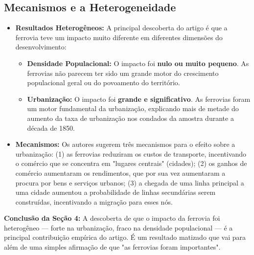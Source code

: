\documentclass[12pt, a4paper]{article}
\begin{document}
\subsection{Mecanismos e a Heterogeneidade}

\begin{itemize}
    \item \textbf{Resultados Heterogêneos:} A principal descoberta do artigo é que a ferrovia teve um impacto muito diferente em diferentes dimensões do desenvolvimento:
        \begin{itemize}
            \item \textbf{Densidade Populacional:} O impacto foi \textbf{nulo ou muito pequeno}. As ferrovias não parecem ter sido um grande motor do crescimento populacional geral ou do povoamento do território.
            \item \textbf{Urbanização:} O impacto foi \textbf{grande e significativo}. As ferrovias foram um motor fundamental da urbanização, explicando mais de metade do aumento da taxa de urbanização nos condados da amostra durante a década de 1850.
        \end{itemize}
    \item \textbf{Mecanismos:} Os autores sugerem três mecanismos para o efeito sobre a urbanização: (1) as ferrovias reduziram os custos de transporte, incentivando o comércio que se concentra em "lugares centrais" (cidades); (2) os ganhos de comércio aumentaram os rendimentos, que por sua vez aumentaram a procura por bens e serviços urbanos; (3) a chegada de uma linha principal a uma cidade aumentou a probabilidade de linhas secundárias serem construídas, incentivando a migração para esses nós.
\end{itemize}

\noindent\textbf{Conclusão da Seção 4:} A descoberta de que o impacto da ferrovia foi heterogêneo — forte na urbanização, fraco na densidade populacional — é a principal contribuição empírica do artigo. É um resultado matizado que vai para além de uma simples afirmação de que "as ferrovias foram importantes".
\end{document}
